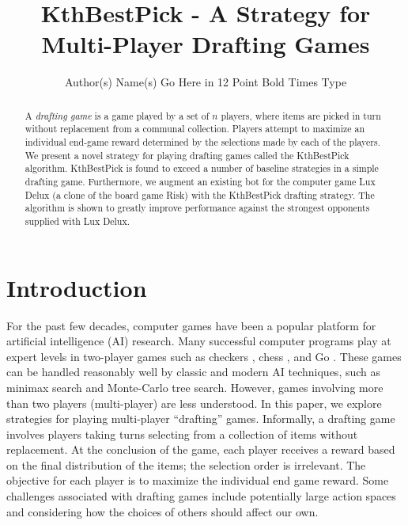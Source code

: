 \documentclass[letterpaper]{article}
\title{KthBestPick - A Strategy for Multi-Player Drafting Games}
\author{Author(s) Name(s) Go Here in 12 Point Bold Times Type}
\numberwithin{equation}{section}
\numberwithin{theorem}{section}
\numberwithin{lemma}{section}
\numberwithin{df}{section}
\begin{document}
\maketitle

\begin{abstract}
A \emph{drafting game} is a game played by a set of $n$ players, where items are picked in turn without replacement from a communal collection.  Players attempt to maximize an individual end-game reward determined by the selections made by each of the players.  We present a novel strategy for playing drafting games called the KthBestPick algorithm.  KthBestPick is found to exceed a number of baseline strategies in a simple drafting game.  Furthermore, we augment an existing bot for the computer game Lux Delux (a clone of the board game Risk) with the KthBestPick drafting strategy. The algorithm is shown to greatly improve performance against the strongest opponents supplied with Lux Delux.
\end{abstract}

\section{Introduction}


For the past few decades, computer games have been a popular platform for artificial intelligence (AI) research.  Many successful computer programs play at expert levels in two-player games such as %
checkers \cite{Chinook}, chess \cite{DeepBlue}, 
and Go \cite{ComputerGo}.  These games can be handled reasonably well by classic and modern AI techniques, such as minimax search and Monte-Carlo tree search.  However, games involving more than two players (multi-player) are less understood.  In this paper, we explore strategies for playing multi-player ``drafting'' games.  Informally, a drafting game involves players taking turns selecting from a collection of items without replacement.  At the conclusion of the game, each player receives a reward based on the final distribution of the items; the selection order is irrelevant.  The objective for each player is to maximize the individual end game reward.  Some challenges associated with drafting games include potentially large action spaces and considering how the choices of others should affect our own.
\end{document}
